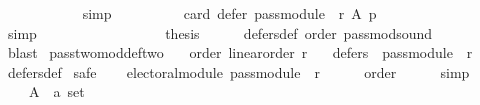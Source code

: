 \begin{isabellebody}
\ \ \ \ \ \ \ \ \ \ \isamarkupfalse%
\ simp\isanewline
\ \ \ \ \ \ \ \ \isamarkupfalse%
\ {\isachardoublequoteopen}card\ {\isacharparenleft}{\kern0pt}defer\ {\isacharparenleft}{\kern0pt}pass{\isacharunderscore}{\kern0pt}module\ {}\ r{\isacharparenright}{\kern0pt}\ A\ p{\isacharparenright}{\kern0pt}\ {\isacharequal}{\kern0pt}\ {}{\isachardoublequoteclose}\isanewline
\ \ \ \ \ \ \ \ \ \ \isamarkupfalse%
\ simp\isanewline
\ \ \ \ \ \ \isamarkupfalse%
\isanewline
\ \ \ \ \isamarkupfalse%
\isanewline
\ \ \isamarkupfalse%
\isanewline
\ \ \isamarkupfalse%
\ {\isacharquery}{\kern0pt}thesis\isanewline
\ \ \ \ \isamarkupfalse%
\ defers{\isacharunderscore}{\kern0pt}def\ order\ pass{\isacharunderscore}{\kern0pt}mod{\isacharunderscore}{\kern0pt}sound\isanewline
\ \ \ \ \isamarkupfalse%
\ blast\isanewline
{}\isamarkupfalse%
%
\endisatagproof
{\isafoldproof}%
%
\isadelimproof
\isanewline
%
\endisadelimproof
\isanewline
{}\isamarkupfalse%
\ pass{\isacharunderscore}{\kern0pt}two{\isacharunderscore}{\kern0pt}mod{\isacharunderscore}{\kern0pt}def{\isacharunderscore}{\kern0pt}two{\isacharcolon}{\kern0pt}\isanewline
\ \ \ order{\isacharcolon}{\kern0pt}\ {\isachardoublequoteopen}linear{\isacharunderscore}{\kern0pt}order\ r{\isachardoublequoteclose}\isanewline
\ \ \ {\isachardoublequoteopen}defers\ {}\ {\isacharparenleft}{\kern0pt}pass{\isacharunderscore}{\kern0pt}module\ {}\ r{\isacharparenright}{\kern0pt}{\isachardoublequoteclose}\isanewline
%
\isadelimproof
\ \ %
\endisadelimproof
%
\isatagproof
{}\isamarkupfalse%
\ defers{\isacharunderscore}{\kern0pt}def\isanewline
{}\isamarkupfalse%
\ {\isacharparenleft}{\kern0pt}safe{\isacharparenright}{\kern0pt}\isanewline
\ \ \isamarkupfalse%
\ {\isachardoublequoteopen}electoral{\isacharunderscore}{\kern0pt}module\ {\isacharparenleft}{\kern0pt}pass{\isacharunderscore}{\kern0pt}module\ {}\ r{\isacharparenright}{\kern0pt}{\isachardoublequoteclose}\isanewline
\ \ \ \ \isamarkupfalse%
\ order\isanewline
\ \ \ \ \isamarkupfalse%
\ simp\isanewline
{}\isamarkupfalse%
\isanewline
\ \ \isamarkupfalse%
\isanewline
\ \ \ \ A\ {\isacharcolon}{\kern0pt}{\isacharcolon}{\kern0pt}\ {\isachardoublequoteopen}{\isacharprime}{\kern0pt}a\ set{\isachardoublequoteclose}\ \isanewline

\end{isabellebody}
